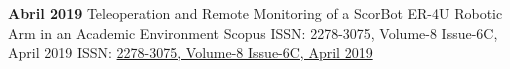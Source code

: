 \begin{devent}
    \cvevent
	{\textbf{Abril 2019}}
	{Teleoperation and Remote Monitoring of a ScorBot ER-4U Robotic Arm in an Academic Environment}
	{Scopus ISSN: 2278-3075, Volume-8 Issue-6C, April 2019}
	{ISSN: \href{https://www.ijitee.org/wp-content/uploads/papers/v8i6c/F12170486C19.pdf}{2278-3075, Volume-8 Issue-6C, April 2019}}
	{}
\end{devent}


\newpage
\setlength{\headheight}{15pt}
\pagestyle{fancy}
\fancyhf{}
\rhead[Ponencias]{\rightmark}
\lfoot[\thepage]{}
\rfoot[]{\thepage}

